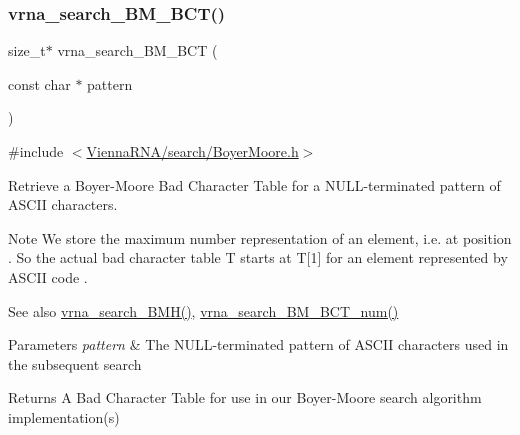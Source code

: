 \subsubsection{\texorpdfstring{vrna\_search\_BM\_BCT()}{vrna\_search\_BM\_BCT()}}
{\footnotesize\ttfamily size\+\_\+t$\ast$ vrna\+\_\+search\+\_\+\+B\+M\+\_\+\+B\+CT (\begin{DoxyParamCaption}\item[{const char $\ast$}]{pattern }\end{DoxyParamCaption})}



{\ttfamily \#include $<$\mbox{\hyperlink{BoyerMoore_8h}{Vienna\+R\+N\+A/search/\+Boyer\+Moore.\+h}}$>$}



Retrieve a Boyer-\/\+Moore Bad Character Table for a N\+U\+L\+L-\/terminated pattern of A\+S\+C\+II characters. 

\begin{DoxyNote}{Note}
We store the maximum number representation of an element, i.\+e. {} at position {}. So the actual bad character table {\ttfamily T} starts at {\ttfamily T}\mbox{[}1\mbox{]} for an element represented by A\+S\+C\+II code {}.
\end{DoxyNote}
\begin{DoxySeeAlso}{See also}
\mbox{\hyperlink{group__search__utils_ga72574a7cf9786d825ce73f7f7748d3c4}{vrna\+\_\+search\+\_\+\+B\+M\+H()}}, \mbox{\hyperlink{group__search__utils_gad315a442e099c86c5dbf6c1c7933223d}{vrna\+\_\+search\+\_\+\+B\+M\+\_\+\+B\+C\+T\+\_\+num()}}
\end{DoxySeeAlso}

\begin{DoxyParams}{Parameters}
{\em pattern} & The N\+U\+L\+L-\/terminated pattern of A\+S\+C\+II characters used in the subsequent search \\
\hline
\end{DoxyParams}
\begin{DoxyReturn}{Returns}
A Bad Character Table for use in our Boyer-\/\+Moore search algorithm implementation(s) 
\end{DoxyReturn}
